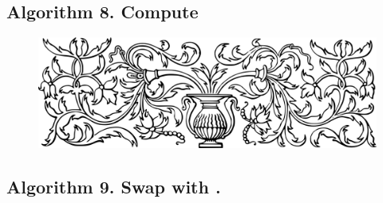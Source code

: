 \documentclass[preview]{standalone}
\begin{document}
\subsection[Compute beta to the power of lambda.]{
    \color{section} Algorithm 8. \color{black} Compute \bm{$\beta^\lambda$}
}
\vspace{-1\baselineskip}

\vspace{1\baselineskip}
\begin{center}
    
\end{center}
\vspace{1\baselineskip}
\begin{center}
    
\end{center}
\pagebreak


\begin{figure}[!h]
    \centering
    \includegraphics[width=14cm]{../resources/jpg/3.1.algorithms/border1.png}
\end{figure}
\subsection[Swap lambda with iota.]{
    \color{section} Algorithm 9. \color{black} Swap \bm{$\lambda$} with \bm{$\iota$}.
}
\vspace{-1\baselineskip}

\vspace{1\baselineskip}
\begin{center}
    
\end{center}
\vspace{.7\baselineskip}
\begin{center}
    
\end{center}
\pagebreak
\end{document}
